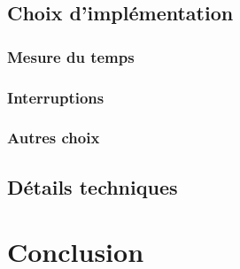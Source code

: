 \documentclass[12pt,a4paper]{article}
\begin{document}
    \subsection{Choix d'implémentation}
    \subsubsection{Mesure du temps}
    \subsubsection{Interruptions}
    \subsubsection{Autres choix}
    \subsection{Détails techniques}
    
\section{Conclusion}
    
\end{document}
